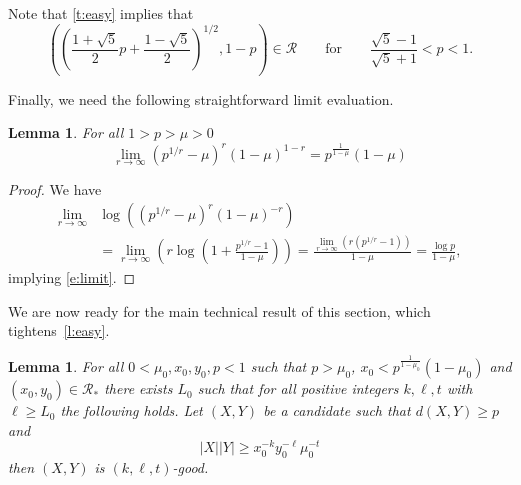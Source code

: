 \documentclass[reqno,final,12pt]{amsart}
\newtheorem{lem}[thm]{Lemma}
\newcommand{\mc}[1]{\mathcal{#1}}
\newcommand{\s}[1]{\left(#1\right)}
\begin{document}
Note that \cref{t:easy} implies that $$\s{\s{\frac{1+\sqrt{5}}{2}p+\frac{1-\sqrt{5}}{2}}^{1/2},1-p} \in \mc{R} \qquad \mathrm{for} \qquad \frac{\sqrt{5}-1}{\sqrt{5}+1}< p <1.$$


Finally, we need the following straightforward limit evaluation.

\begin{lem}\label{l:limit} 
	For all $1>  p >  \mu >0$ 
	\begin{equation}\label{e:limit} \lim_{r \to \infty}(p^{1/r}-\mu)^r(1-\mu)^{1-r}=p^{\frac{1}{1-\mu}}(1-\mu)
	\end{equation} 
\end{lem}


\begin{proof}
	We have
	\begin{align*} \lim_{r \to \infty}&\log\s{(p^{1/r}-\mu)^r(1-\mu)^{-r}} \\&=\lim_{r \to \infty} \s{r \log\s{1+\frac{p^{1/r}-1}{1-\mu}}} =\frac{\lim_{r \to \infty} \s{r(p^{1/r}-1)}}{1-\mu}=\frac{\log p}{1-\mu},
	\end{align*}
	implying \eqref{e:limit}.
\end{proof}	

We are now ready for the main technical result of this section, which tightens~\cref{l:easy}.

\begin{lem}\label{t:bookmain}  For all $0< \mu_0,x_0,y_0,p <1$ such that $p > \mu _0$, $x_0 < p^{\frac{1}{1-\mu_0}}(1-\mu_0)$ and $(x_0,y_0) \in \mc{R_*}$ there exists $L_0$ such that for all positive integers $k,\ell,t$ with $\ell \geq L_0$  the following holds.
			Let $(X,Y)$ be a candidate such that $d(X,Y) \geq p$ and  \begin{equation}\label{e:bookmain} |X||Y| \geq x_0^{-k}y_0^{-\ell}\mu_0^{-t }\end{equation} 
			then $(X,Y)$ is $(k,\ell,t)$-good.
\end{lem}
\end{document}

